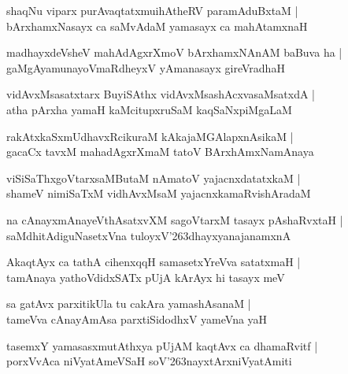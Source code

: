 \documentclass[twoside,12pt,openright]{book}
\def\S{\char'263}
\newcounter{shloka}[chapter]
\begin{document}
\begin{shloka}%
shaqNu viparx purAvaqtatxmuihAtheRV paramAduBxtaM |\\
bArxhamxNasayx ca saMvAdaM yamasayx ca mahAtamxnaH 
\end{shloka}

\begin{shloka}%
madhayxdeVsheV mahAdAgxrXmoV bArxhamxNAnAM baBuva ha |\\
gaMgAyamunayoVmaRdheyxV yAmanasayx gireVradhaH 
\end{shloka}

\begin{shloka}%
vidAvxMsasatxtarx BuyiSAthx vidAvxMsashAcxvasaMsatxdA |\\
atha pArxha yamaH kaMcitupxruSaM kaqSaNxpiMgaLaM 
\end{shloka}

\begin{shloka}%
rakAtxkaSxmUdhavxRcikuraM kAkajaMGAlapxnAsikaM |\\
gacaCx tavxM mahadAgxrXmaM tatoV BArxhAmxNamAnaya  
\end{shloka}

\begin{shloka}%
viSiSaThxgoVtarxsaMButaM nAmatoV yajacnxdatatxkaM |\\
shameV nimiSaTxM vidhAvxMsaM yajacnxkamaRvishAradaM 
\end{shloka}

\begin{shloka}%
na cAnayxmAnayeVthAsatxvXM sagoVtarxM tasayx pAshaRvxtaH |\\
saMdhitAdiguNasetxVna tuloyxV\S dhayxyanajanamxnA
\end{shloka}

\begin{shloka}%
AkaqtAyx ca tathA cihenxqqH samasetxYreVva satatxmaH |\\
tamAnaya yathoVdidxSATx pUjA kArAyx hi tasayx meV 
\end{shloka}

\begin{shloka}%
sa gatAvx parxitikUla tu cakAra yamashAsanaM |\\
tameVva cAnayAmAsa parxtiSidodhxV yameVna yaH 
\end{shloka}

\begin{shloka}%
tasemxY yamasasxmutAthxya pUjAM kaqtAvx ca dhamaRvitf |\\
porxVvAca niVyatAmeVSaH soV\S nayxtArxniVyatAmiti
\end{shloka}
\end{document}
